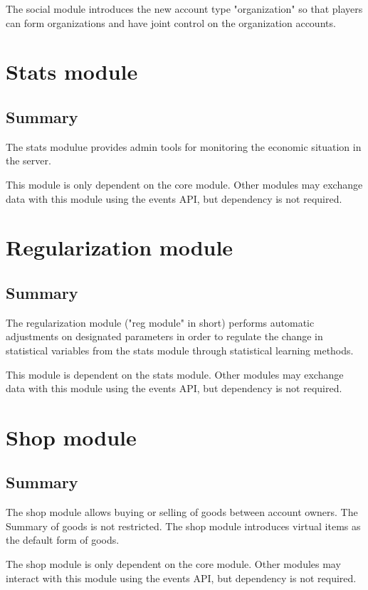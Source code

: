 \documentclass{report}
\begin{document}
			The social module introduces the new account type "organization" so that players can form organizations
			and have joint control on the organization accounts.

	\part{Stats module}
		\chapter{Summary}

			The stats modulue provides admin tools for monitoring the economic situation in the server.

			This module is only dependent on the core module.
			Other modules may exchange data with this module using the events API,
			but dependency is not required.

	\part{Regularization module}
		\chapter{Summary}

			The regularization module ("reg module" in short) performs automatic adjustments on designated parameters
			in order to regulate the change in statistical variables from the stats module through statistical learning methods.

			This module is dependent on the stats module.
			Other modules may exchange data with this module using the events API,
			but dependency is not required.

	\part{Shop module}
		\chapter{Summary}

			The shop module allows buying or selling of goods between account owners.
			The Summary of goods is not restricted.
			The shop module introduces virtual items as the default form of goods.

			The shop module is only dependent on the core module.
			Other modules may interact with this module using the events API,
			but dependency is not required.
\end{document}
